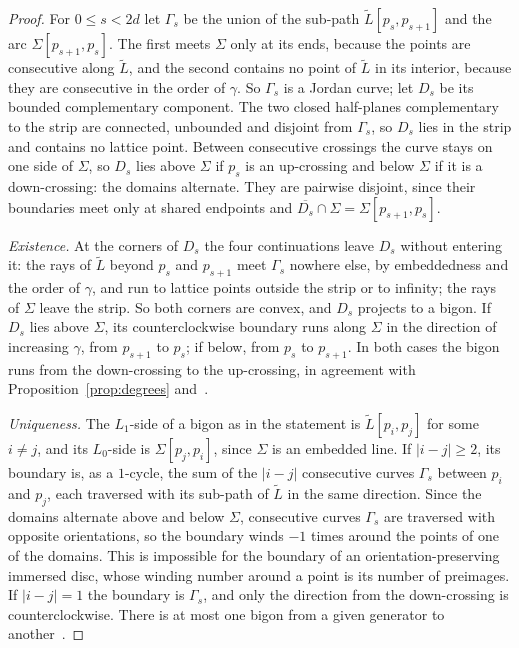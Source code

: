 \begin{proof}
For $0\le s<2d$ let $\Gamma_s$ be the union of the sub-path $\tilde L[p_s,p_{s+1}]$ and the arc $\Sigma[p_{s+1},p_s]$. The first meets $\Sigma$
only at its ends, because the points are consecutive along $\tilde L$, and the second contains no point of $\tilde L$ in its interior,
because they are consecutive in the order of $\gamma$. So $\Gamma_s$ is a Jordan curve; let $D_s$ be its bounded complementary
component. The two closed half-planes complementary to the strip are connected, unbounded and disjoint from $\Gamma_s$, so
$D_s$ lies in the strip and contains no lattice point. Between consecutive crossings the curve stays on one side of $\Sigma$,
so $D_s$ lies above $\Sigma$ if $p_s$ is an up-crossing and below $\Sigma$ if it is a down-crossing: the domains alternate. They are
pairwise disjoint, since their boundaries meet only at shared endpoints and $\overline{D_s}\cap\Sigma=\Sigma[p_{s+1},p_s]$.

\emph{Existence.} At the corners of $D_s$ the four continuations leave $D_s$ without entering it: the rays of $\tilde L$ beyond
$p_s$ and $p_{s+1}$ meet $\Gamma_s$ nowhere else, by embeddedness and the order of $\gamma$, and run to lattice points outside the strip
or to infinity; the rays of $\Sigma$ leave the strip. So both corners are convex, and $D_s$ projects to a bigon. If $D_s$
lies above $\Sigma$, its counterclockwise boundary runs along $\Sigma$ in the direction of increasing $\gamma$, from $p_{s+1}$ to $p_s$; if
below, from $p_s$ to $p_{s+1}$. In both cases the bigon runs from the down-crossing to the up-crossing, in agreement with
Proposition~\ref{prop:degrees} and~\cite[Prop.~3.8]{HHK2}.

\emph{Uniqueness.} The $L_1$-side of a bigon as in the statement is $\tilde L[p_i,p_j]$ for some $i\neq j$, and its $L_0$-side is
$\Sigma[p_j,p_i]$, since $\Sigma$ is an embedded line. If $|i-j|\ge2$, its boundary is, as a $1$-cycle, the sum of the $|i-j|$
consecutive curves $\Gamma_s$ between $p_i$ and $p_j$, each traversed with its sub-path of $\tilde L$ in the same direction. Since the
domains alternate above and below $\Sigma$, consecutive curves $\Gamma_s$ are traversed with opposite orientations, so the
boundary winds $-1$ times around the points of one of the domains. This is impossible for the boundary of an
orientation-preserving immersed disc, whose winding number around a point is its number of preimages. If $|i-j|=1$
the boundary is $\Gamma_s$, and only the direction from the down-crossing is counterclockwise. There is at most one bigon
from a given generator to another~\cite[Cor.~3.13]{HHK2}.
\end{proof}

